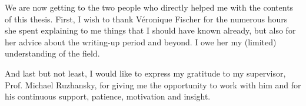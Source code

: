 We are now getting to the two people who directly helped me with the contents of this thesis.
First, I wish to thank V\'eronique Fischer for the numerous hours she spent
explaining to me things that I should have known already,
but also for her advice about the writing-up period and beyond.
I owe her my (limited) understanding of the field.

And last but not least,
I would like to express my gratitude to my supervisor,
Prof. Michael Ruzhansky,
for giving me the opportunity to work with him and for his continuous support, patience, motivation and insight.
